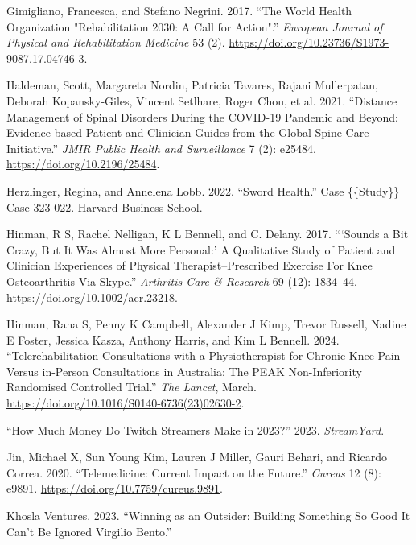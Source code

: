 \documentclass[
  letterpaper,
]{article}
\newlength{\cslhangindent}
\newenvironment{CSLReferences}[2] %
 {\begin{list}{}{%
  \setlength{\itemindent}{0pt}
  \setlength{\leftmargin}{0pt}
  \setlength{\parsep}{0pt}
  \ifodd #1
   \setlength{\leftmargin}{\cslhangindent}
   \setlength{\itemindent}{-1\cslhangindent}
  \fi
  \setlength{\itemsep}{#2\baselineskip}}}
 {\end{list}}
\begin{document}
\begin{CSLReferences}{1}{0}
Gimigliano, Francesca, and Stefano Negrini. 2017. {``The {World Health
Organization} "{Rehabilitation} 2030: A Call for Action".''}
\emph{European Journal of Physical and Rehabilitation Medicine} 53 (2).
\url{https://doi.org/10.23736/S1973-9087.17.04746-3}.

Haldeman, Scott, Margareta Nordin, Patricia Tavares, Rajani Mullerpatan,
Deborah Kopansky-Giles, Vincent Setlhare, Roger Chou, et al. 2021.
{``Distance Management of Spinal Disorders During the {COVID-19}
Pandemic and Beyond: {Evidence-based} Patient and Clinician Guides from
the Global Spine Care Initiative.''} \emph{JMIR Public Health and
Surveillance} 7 (2): e25484. \url{https://doi.org/10.2196/25484}.

Herzlinger, Regina, and Annelena Lobb. 2022. {``Sword {Health}.''} Case
\{\{Study\}\} Case 323-022. Harvard Business School.

Hinman, R S, Rachel Nelligan, K L Bennell, and C. Delany. 2017.
{``{`{Sounds} a {Bit Crazy}, {But It Was Almost More Personal}:'} {A
Qualitative Study} of {Patient} and {Clinician Experiences} of {Physical
Therapist}--{Prescribed Exercise For Knee Osteoarthritis Via Skype}.''}
\emph{Arthritis Care \& Research} 69 (12): 1834--44.
\url{https://doi.org/10.1002/acr.23218}.

Hinman, Rana S, Penny K Campbell, Alexander J Kimp, Trevor Russell,
Nadine E Foster, Jessica Kasza, Anthony Harris, and Kim L Bennell. 2024.
{``Telerehabilitation Consultations with a Physiotherapist for Chronic
Knee Pain Versus in-Person Consultations in {Australia}: The {PEAK}
Non-Inferiority Randomised Controlled Trial.''} \emph{The Lancet},
March. \url{https://doi.org/10.1016/S0140-6736(23)02630-2}.

{``How {Much Money Do Twitch Streamers Make} in 2023?''} 2023.
\emph{StreamYard}.

Jin, Michael X, Sun Young Kim, Lauren J Miller, Gauri Behari, and
Ricardo Correa. 2020. {``Telemedicine: {Current Impact} on the
{Future}.''} \emph{Cureus} 12 (8): e9891.
\url{https://doi.org/10.7759/cureus.9891}.

Khosla Ventures. 2023. {``Winning as an {Outsider}: {Building Something
So Good It Can}'t {Be Ignored} {\textbar} {Virgilio Bento}.''}


\end{CSLReferences}
\end{document}
